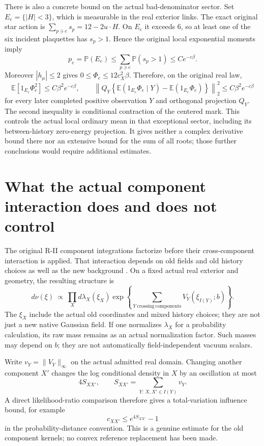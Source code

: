 \documentclass[11pt,letterpaper]{article}
\theoremstyle{remark}\newtheorem{remark}[theorem]{Remark}
\newcommand{\E}{\mathbb E}
\begin{document}
There is also a concrete bound on the actual bad-denominator sector. Set
\(E_e=\{|H|<3\}\), which is measurable in the real exterior links. The exact original star action is \(\sum_{p\ni e}s_p=12-2u\cdot H\). On \(E_e\) it exceeds \(6\), so at least one of the six incident plaquettes has \(s_p>1\). Hence the original local exponential moments imply
\[
 p_e=\mathbb P(E_e)\le\sum_{p\ni e}\mathbb P(s_p>1)
 \le C e^{-c\beta}.
\]
Moreover \(|h_\mu|\le2\) gives
\(0\le\Phi_e\le12c_X^2\beta\). Therefore, on the original real law,
\begin{equation}\label{eq:actualbadstar}
 \E[1_{E_e}\Phi_e^2]\le C\beta^2e^{-c\beta},\qquad
 \left\|Q_Y\left\{\E(1_{E_e}\Phi_e\mid Y)
                 -\E(1_{E_e}\Phi_e)\right\}\right\|_2^2
 \le C\beta^2e^{-c\beta}
\end{equation}
for every later completed positive observation \(Y\) and orthogonal projection \(Q_Y\). The second inequality is conditional contraction of the centered mark. This controls the actual local ordinary mean in that exceptional sector, including its between-history zero-energy projection. It gives neither a complex derivative bound there nor an extensive bound for the sum of all roots; those further conclusions would require additional estimates.

\section{What the actual component interaction does and does not control}

The original R-II component integrations factorize before their cross-component interaction is applied. That interaction depends on old fields and old history choices as well as the new background \cite{RII}. On a fixed actual real exterior and geometry, the resulting structure is
\begin{equation}\label{eq:components}
 d\nu(\xi)\ \propto\
 \prod_Xd\lambda_X(\xi_X)
 \exp\!\left\{\sum_{Y\ \mathrm{crossing\ components}}
 V_Y(\xi_{I(Y)};b)\right\}.
\end{equation}
The \(\xi_X\) include the actual old coordinates and mixed history choices; they are not just a new native Gaussian field. If one normalizes \(\lambda_X\) for a probability calculation, its raw mass remains as an actual normalization factor. Such masses may depend on \(b\); they are not automatically field-independent vacuum scalars.

Write \(v_Y=\|V_Y\|_\infty\) on the actual admitted real domain. Changing another component \(X'\) changes the log conditional density in \(X\) by an oscillation at most
\[
 4S_{XX'},\qquad
 S_{XX'}=\sum_{Y:\,X,X'\in I(Y)}v_Y.
\]
A direct likelihood-ratio comparison therefore gives a total-variation influence bound, for example
\begin{equation}\label{eq:influence}
 c_{XX'}\le e^{4S_{XX'}}-1
\end{equation}
in the probability-distance convention. This is a genuine estimate for the old component kernels; no convex reference replacement has been made.
\end{document}
